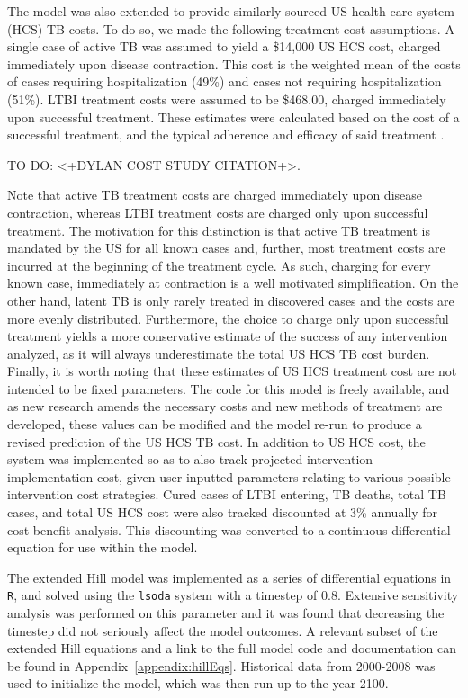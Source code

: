 \documentclass{amsart}
\renewcommand{\(}{\left(}
\renewcommand{\)}{\right)}
\newcommand{\TODO}[1]{\begin{framed}{\huge \color{red} TO DO:}
  #1 \end{framed}}
\begin{document}
The model was also extended to provide similarly sourced US health care system
(HCS) TB costs. To do so, we made the following treatment cost assumptions. A
single case of active TB was assumed to yield a \$14,000 US HCS cost, charged
immediately upon disease contraction. This cost is the weighted mean of the
costs of cases requiring hospitalization (49\%) and cases not requiring
hospitalization (51\%).  LTBI treatment costs were assumed to be \$468.00,
charged immediately upon successful treatment. These estimates were calculated
based on the cost of a successful treatment, and the typical adherence and
efficacy of said treatment
\cite{lobue_use_2003,page_kr_improved_2006,denholm_use_2010}.
\TODO{<+DYLAN COST STUDY CITATION+>.} 
Note
that active TB treatment costs are charged immediately upon disease contraction,
whereas LTBI treatment costs are charged only upon successful treatment. The
motivation for this distinction is that active TB treatment is mandated by the
US for all known cases and, further, most treatment costs are incurred at the
beginning of the treatment cycle. As such, charging for every known case,
immediately at contraction is a well motivated simplification. On the other
hand, latent TB is only rarely treated in discovered cases and the costs are
more evenly distributed. Furthermore, the choice to charge only upon successful
treatment yields a more conservative estimate of the success of any intervention
analyzed, as it will always underestimate the total US HCS TB cost burden.
Finally, it is worth noting that these estimates of US HCS treatment cost are
not intended to be fixed parameters. The code for this model is freely
available, and as new research amends the necessary costs and new methods of
treatment are developed, these values can be modified and the model re-run to
produce a revised prediction of the US HCS TB cost. In addition to US HCS cost,
the system was implemented so as to also track projected intervention
implementation cost, given user-inputted parameters relating to various possible
intervention cost strategies.  Cured cases of LTBI entering, TB deaths, total TB
cases, and total US HCS cost were also tracked discounted at 3\% annually for
cost benefit analysis. This discounting was converted to a continuous
differential equation for use within the model. 
 
The extended Hill model was implemented as a series of differential equations in
\texttt{R}, and solved using the \texttt{lsoda} system with a timestep of $0.8$.
Extensive sensitivity analysis was performed on this parameter and it was found
that decreasing the timestep did not seriously affect the model outcomes.  A
relevant subset of the extended Hill equations and a link to the full model code
and documentation can be found in Appendix~\ref{appendix:hillEqs}. Historical
data from 2000-2008 was used to initialize the model, which was then run up to
the year 2100.  
\end{document}
